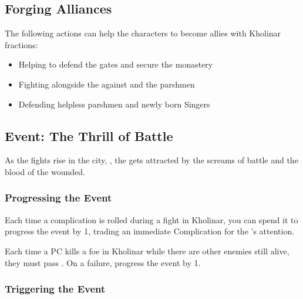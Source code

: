 \subsection{Forging Alliances}

The following actions can help the characters to become allies with Kholinar fractions:
\begin{itemize}
	\item Helping \npcHighmarshal{} to defend the gates and secure the monastery
	\item Fighting alongside the \npcFractionCult{} against \npcHighmarshal{} and the parshmen
	\item Defending helpless parshmen and newly born Singers
\end{itemize}



\subsection{Event: The Thrill of Battle}

As the fights rise in the city, \npcThrill{}, the \npcThrillTitle{} gets attracted by the screams of battle and the blood of the wounded. \\


\subsubsection{Progressing the Event}

Each time a complication is rolled during a fight in Kholinar, you can spend it to progress the event by 1, trading an immediate Complication for the \npcThrill{}'s attention.

Each time a PC kills a foe in Kholinar while there are other enemies still alive, they must pass . On a failure, progress the event by 1.


\subsubsection{Triggering the Event}


